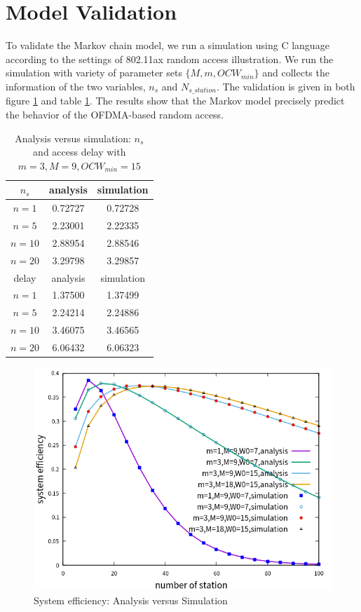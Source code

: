\section{Model Validation} 		\label{sec_model_val}
To validate the Markov chain model, we run a simulation using C language according to the settings of 802.11ax random access illustration. 
We run the simulation with variety of parameter sets $\lbrace M, m, OCW_{min}\rbrace$ and collects the information of the two variables, $n_s$ and $N_{s\_station}$. 
The validation is given in both figure \ref{validation} and table \ref{table_val}. 
The results show that the Markov model precisely predict the behavior of the OFDMA-based random access.
\begin{table}[!h]
\caption{Analysis versus simulation: $n_s$ and access delay with $m=3,M=9,OCW_{min} = 15$}
\label{table_val}
\begin{center}
\begin{tabular}{c|c|c}
\hline
$n_s$ 	& analysis 	& simulation \\
\hline
$n=1$ 	& 0.72727  	& 0.72728 \\
$n=5$ 	& 2.23001	& 2.22335 \\
$n=10$	& 2.88954	& 2.88546 \\
$n=20$	& 3.29798	& 3.29857 \\
\hline
delay	& analysis	& simulation \\
\hline
$n=1$ 	& 1.37500  	& 1.37499 \\
$n=5$ 	& 2.24214	& 2.24886 \\
$n=10$	& 3.46075	& 3.46565 \\
$n=20$	& 6.06432	& 6.06323 \\
\hline
\end{tabular}
\end{center}
\end{table}

\begin{figure}[!h]
\includegraphics[scale=0.54]{./figure/multiple_parameter.png}
\caption{System efficiency: Analysis versus Simulation}
\label{validation}
\end{figure}